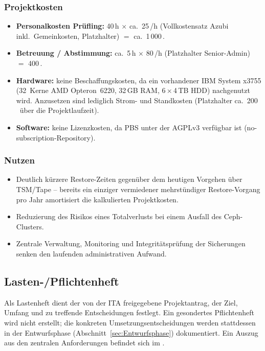 \subsubsection*{Projektkosten}
\begin{itemize}
    \item \textbf{Personalkosten Prüfling:} 40\,h $\times$
          ca.\ 25\,\texteuro/h (Vollkostensatz Azubi inkl.\ Gemeinkosten,
          Platzhalter) $=$ ca.\ 1\,000\,\texteuro.
    \item \textbf{Betreuung / Abstimmung:} ca.\ 5\,h $\times$
          80\,\texteuro/h (Platzhalter Senior-Admin) $=$ 400\,\texteuro.
    \item \textbf{Hardware:} keine Beschaffungskosten, da ein
          vorhandener IBM System x3755 (32~Kerne AMD Opteron~6220,
          32\,GB \ac{RAM}, 6\,$\times$\,4\,TB HDD) nachgenutzt wird.
          Anzusetzen sind lediglich Strom- und Standkosten (Platzhalter
          ca.\ 200\,\texteuro\ über die Projektlaufzeit).
    \item \textbf{Software:} keine Lizenzkosten, da \ac{PBS} unter der
          AGPLv3 verfügbar ist (no-subscription-Repository).
\end{itemize}

\subsubsection*{Nutzen}
\begin{itemize}
    \item Deutlich kürzere Restore-Zeiten gegenüber dem heutigen
          Vorgehen über \ac{TSM}/Tape -- bereits ein einziger
          vermiedener mehrstündiger Restore-Vorgang pro Jahr
          amortisiert die kalkulierten Projektkosten.
    \item Reduzierung des Risikos eines Totalverlusts bei einem
          Ausfall des Ceph-Clusters.
    \item Zentrale Verwaltung, Monitoring und Integritätsprüfung der
          Sicherungen senken den laufenden administrativen Aufwand.
\end{itemize}



\subsection{Lasten-/Pflichtenheft}
\label{sec:Lastenheft}
Als Lastenheft dient der von der \ac{ITA} freigegebene Projektantrag,
der Ziel, Umfang und zu treffende Entscheidungen festlegt.
Ein gesondertes Pflichtenheft wird nicht erstellt; die konkreten
Umsetzungsentscheidungen werden stattdessen in der Entwurfsphase
(Abschnitt~\ref{sec:Entwurfsphase}) dokumentiert.
Ein Auszug aus den zentralen Anforderungen befindet sich im
.
